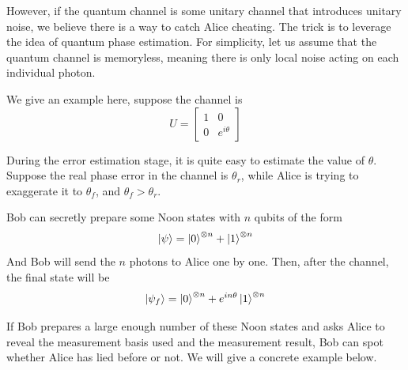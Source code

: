 \documentclass[%
 reprint,
superscriptaddress,
 amsmath,amssymb,
 aps,
]{revtex4-2}
\begin{document}
However, if the quantum channel is some unitary channel that introduces unitary noise, we believe there is a way to catch Alice cheating. The trick is to leverage the idea of quantum phase estimation. For simplicity, let us assume that the quantum channel is memoryless, meaning there is only local noise acting on each individual photon.

We give an example here, suppose the channel is 
\begin{equation}
    U=\begin{bmatrix}
        1 & 0\\
        0&e^{i\theta}
    \end{bmatrix}
\end{equation}

During the error estimation stage, it is quite easy to estimate the value of $\theta$. Suppose the real phase error in the channel is $\theta_r$, while Alice is trying to exaggerate it to $\theta_f$, and $\theta_f>\theta_r$.

Bob can secretly prepare some Noon states with $n$ qubits of the form
\begin{equation}
    \ket{\psi}=\ket{0}^{\otimes n}+\ket{1}^{\otimes n}
\end{equation}
And Bob will send the $n$ photons to Alice one by one. Then, after the channel, the final state will be
\begin{equation}
    \ket{\psi_f}=\ket{0}^{\otimes n}+e^{in\theta}\ket{1}^{\otimes n}
\end{equation}

If Bob prepares a large enough number of these Noon states and asks Alice to reveal the measurement basis used and the measurement result, Bob can spot whether Alice has lied before or not. We will give a concrete example below.
\end{document}
